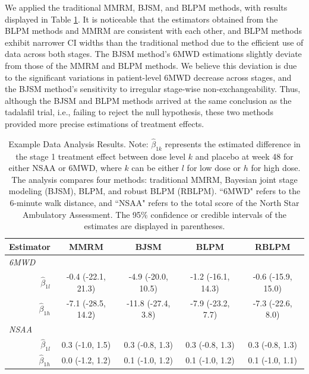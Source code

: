 We applied the traditional \ac{MMRM}, \ac{BJSM}, and \ac{BLPM} methods, with results displayed in Table \ref{tab:comp_longitudinal}. It is noticeable that the estimators obtained from the \ac{BLPM} methods and \ac{MMRM} are consistent with each other, and \ac{BLPM} methods exhibit narrower \ac{CI} widths than the traditional method due to the efficient use of data across both stages. The \ac{BJSM} method's 6MWD estimations slightly deviate from those of the \ac{MMRM} and \ac{BLPM} methods. We believe this deviation is due to the significant variations in patient-level 6MWD decrease across stages, and the \ac{BJSM} method's sensitivity to irregular stage-wise non-exchangeability. Thus, although the \ac{BJSM} and \ac{BLPM} methods arrived at the same conclusion as the tadalafil trial, i.e., failing to reject the null hypothesis, these two methods provided more precise estimations of treatment effects.


\begin{table} 
\caption{\label{tab:comp_longitudinal} Example Data Analysis Results. Note: $\widehat{\beta}_{1k}$ represents the estimated difference in the stage 1 treatment effect between dose level $k$ and placebo at week 48 for either NSAA or 6MWD, where $k$ can be either $l$ for low dose or $h$ for high dose. The analysis compares four methods: traditional MMRM, Bayesian joint stage modeling (BJSM), BLPM, and robust BLPM (RBLPM). ``6MWD" refers to the 6-minute walk distance, and ``NSAA" refers to the total score of the North Star Ambulatory Assessment. The 95\% confidence or credible intervals of the estimates are displayed in parentheses.}
\centering
\begin{tabular}{ccccc}
\hline
Estimator &  MMRM &  BJSM &  BLPM  & RBLPM \tabularnewline
\hline
\multicolumn{1}{l}{\textit{6MWD}} &&&&\\
\multicolumn{1}{r}{$\widehat{\beta}_{1l}$} &  -0.4 (-22.1, 21.3) &  -4.9 (-20.0, 10.5) &  -1.2 (-16.1, 14.3) &  -0.6 (-15.9, 15.0)  \tabularnewline 

\multicolumn{1}{r}{$\widehat{\beta}_{1h}$}  &  -7.1 (-28.5, 14.2) &  -11.8 (-27.4, 3.8) &  -7.9 (-23.2, 7.7) &  -7.3 (-22.6, 8.0)  \tabularnewline


\hline
\multicolumn{1}{l}{\textit{NSAA}} &&&&\\
\multicolumn{1}{r}{$\widehat{\beta}_{1l}$} &  0.3 (-1.0, 1.5) &  0.3 (-0.8, 1.3)  &  0.3 (-0.8, 1.3) &  0.3 (-0.8, 1.3) \tabularnewline

\multicolumn{1}{r}{$\widehat{\beta}_{1h}$} &  0.0 (-1.2, 1.2) &  0.1 (-1.0, 1.2)  &  0.1 (-1.0, 1.2) &   0.1 (-1.0, 1.1)\tabularnewline
\hline
\end{tabular}
\end{table}

